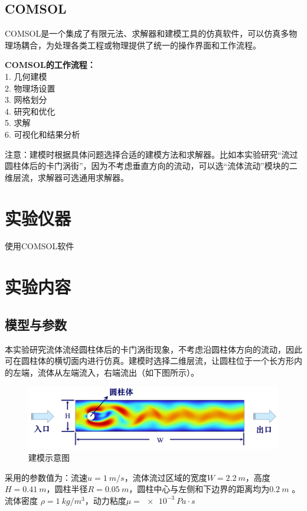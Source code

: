 \documentclass[a4paper,zihao=5,UTF8,fontset=fandol]{phyreport}
\begin{document}
\subsection{COMSOL}
COMSOL是一个集成了有限元法、求解器和建模工具的仿真软件，可以仿真多物理场耦合，为处理各类工程或物理提供了统一的操作界面和工作流程。

\textbf{COMSOL的工作流程：}\\
1. 几何建模\\
2. 物理场设置\\
3. 网格划分\\
4. 研究和优化\\
5. 求解\\
6. 可视化和结果分析

注意：建模时根据具体问题选择合适的建模方法和求解器。比如本实验研究“流过圆柱体后的卡门涡街”，因为不考虑垂直方向的流动，可以选“流体流动”模块的二维层流，求解器可选通用求解器。

\longLine
\section{实验仪器}
使用COMSOL软件

\longLine
\section{实验内容}

\subsection{模型与参数}
本实验研究流体流经圆柱体后的卡门涡街现象，不考虑沿圆柱体方向的流动，因此可在圆柱体的横切面内进行仿真。建模时选择二维层流，让圆柱位于一个长方形内的左端，流体从左端流入，右端流出（如下图所示）。
\begin{figure}[H]
  \centering
  \includegraphics[width=0.8\linewidth]{示意图.png}
  \caption{建模示意图}
\end{figure}
采用的参数值为：流速$u=\qty{1}{m/s}$，流体流过区域的宽度$W=\qty{2.2}{m}$，高度$H=\qty{0.41}{m}$，圆柱半径$R=\qty{0.05}{m}$，圆柱中心与左侧和下边界的距离均为$\qty{0.2}{m}$ 。 流体密度 $\rho= \qty{1}{kg/m^3}$，动力粘度$\mu=\qty{e-3}{Pa\cdot s}$
\end{document}
